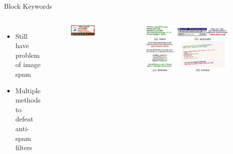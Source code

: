 \documentclass[nobackground,dvipsnames,table,aspectratio=169]{beamer}
\begin{document}
\begin{frame}{Block Keywords}
    \begin{columns}
            \begin{itemize}
                \item Still have problem of  image spam 
                \item Multiple methods to defeat anti-spam filters
            \end{itemize}
            \begin{figure}
                \centering
                \includegraphics[width=\textwidth]{viagra-ad}
            \end{figure}
            \begin{figure}
                \centering
                \includegraphics[width=\textwidth]{keyword-blocking-bypass}
            \end{figure}
    \end{columns}
\end{frame}
\end{document}
